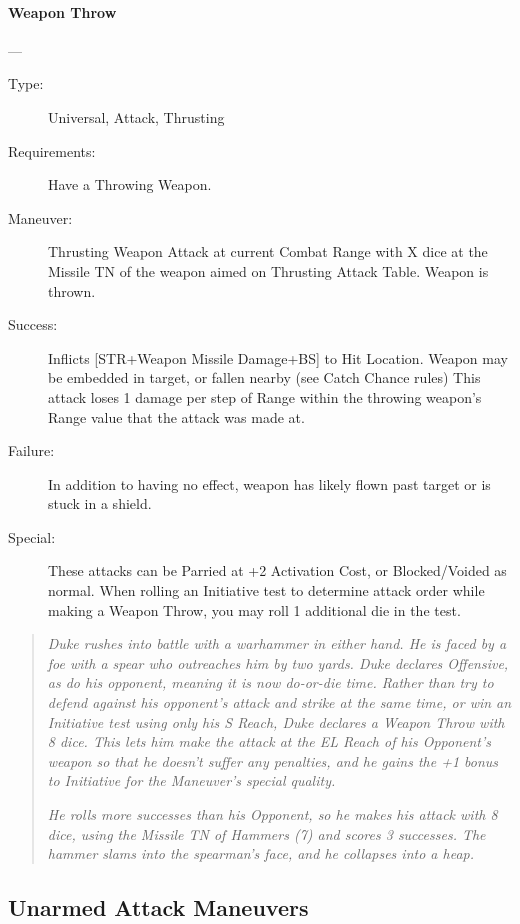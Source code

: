 \documentclass[oneside,11pt,english]{book}
\begin{document}
\paragraph{\large\label{man:Weapon Throw}Weapon Throw}---\quad{\large[X+1]}
\vspace{-10pt}\begin{description} 
\item [Type:] Universal, Attack, Thrusting 
\item [Requirements:] Have a Throwing Weapon. 
\item [Maneuver:] Thrusting Weapon Attack at current Combat Range with X dice at the Missile TN of the 
weapon aimed on Thrusting Attack Table. Weapon is thrown. 
\item [Success:] Inflicts [STR+Weapon Missile Damage+BS] to Hit Location. Weapon may be embedded in 
target, or fallen nearby (see Catch Chance rules) This attack loses 1 damage per step of Range within the 
throwing weapon’s Range value that the attack was made at. 
\item [Failure:] In addition to having no effect, weapon has likely flown past target or is stuck in a shield. 
\item [Special:] These attacks can be Parried at +2 Activation Cost, or Blocked/Voided as normal. When rolling 
an Initiative test to determine attack order while making a Weapon Throw, you may roll 1 additional die 
in the test.
\end{description}
\begin{quotation}
\emph{Duke rushes into battle with a warhammer in either hand. He is faced by a foe with a spear who outreaches him by two yards. 
Duke declares Offensive, as do his opponent, meaning it is now do-or-die time. Rather than try to defend against his opponent’s 
attack and strike at the same time, or win an Initiative test using only his S Reach, Duke declares a Weapon Throw with 8 dice. 
This lets him make the attack at the EL Reach of his Opponent’s weapon so that he doesn’t suffer any penalties, and he gains the 
+1 bonus to Initiative for the Maneuver’s special quality.}

\emph{He rolls more successes than his Opponent, so he makes his attack with 8 dice, using the Missile TN of Hammers (7) and scores 3 successes. The hammer slams into the spearman’s face, and he collapses into a heap. }
\end{quotation}


\subsection{Unarmed Attack Maneuvers}
\end{document}

